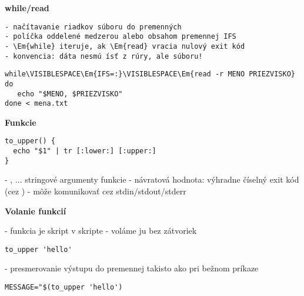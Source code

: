 \documentclass[8pt,landscape]{extarticle}
\newcommand{\Heading}[1]{%
{\begin{center}\bfseries\Large#1\end{center}}%
}%
\newcommand{\Em}[1]{\Ovalbox{\ttfamily #1}}
\def\VISIBLESPACE{{\tiny $\sqcup$}}
\newenvironment{karticka}[1]%
{%
\Heading{#1}%
}%
{%
\clearpage
}%
\begin{document}
\newpage
\begin{karticka}{while/read}
\begin{Verbatim}[commandchars=\\\{\}]
- načítavanie riadkov súboru do premenných
- políčka oddelené medzerou alebo obsahom premennej IFS
- \Em{while} iteruje, ak \Em{read} vracia nulový exit kód
- konvencia: dáta nesmú ísť z rúry, ale súboru!
\end{Verbatim}
%
\begin{middlecolorbox}
\begin{Verbatim}[commandchars=\\\{\}]
while\VISIBLESPACE\Em{IFS=:}\VISIBLESPACE\Em{read -r MENO PRIEZVISKO}
do
   echo "$MENO, $PRIEZVISKO"
done < mena.txt
\end{Verbatim}
\end{middlecolorbox}
\end{karticka}
\begin{karticka}{Funkcie}
\begin{middlecolorbox}
\begin{Verbatim}
to_upper() {
  echo "$1" | tr [:lower:] [:upper:]
}
\end{Verbatim}
\end{middlecolorbox}
\begin{obsah}
- \Em{$1}, \Em{$2}... stringové argumenty funkcie
- návratová hodnota: výhradne číselný exit kód 
  (cez \Em{return})
- môže komunikovať cez stdin/stdout/stderr
\end{obsah}
\end{karticka}

\begin{karticka}{Volanie funkcií}
\begin{obsah}
- funkcia je skript v skripte
- voláme ju bez zátvoriek
\end{obsah}

\begin{middlecolorbox}
\begin{Verbatim}
to_upper 'hello'
\end{Verbatim}
\end{middlecolorbox}
%
\begin{obsah}
- presmerovanie výstupu do premennej takisto ako 
  pri bežnom príkaze
\end{obsah}
%
\begin{middlecolorbox}
\begin{Verbatim}
MESSAGE="$(to_upper 'hello')
\end{Verbatim}
\end{middlecolorbox}
%
\end{karticka}
\end{document}
